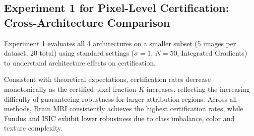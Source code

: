 \documentclass[11pt]{article}
\begin{document}
\subsection{Experiment 1 for Pixel-Level Certification: Cross-Architecture Comparison}

Experiment 1 evaluates all 4 architectures on a smaller subset (5 images per dataset, 20 total) using standard settings ($\sigma=1$, $N=50$, Integrated Gradients) to understand architecture effects on certification. 

\begin{table}[h!]
\centering
\caption{Experiment 1: Average certification accuracy (\%) across datasets and models for different top-$K$ certified pixel fractions.}
\label{tab:exp1_cert}
\end{table}
Consistent with theoretical expectations, certification rates decrease monotonically as the certified pixel fraction $K$ increases, reflecting the increasing difficulty of guaranteeing robustness for larger attribution regions. Across all methods, Brain MRI consistently achieves the highest certification rates, while Fundus and ISIC exhibit lower robustness due to class imbalance, color and texture complexity. 
\end{document}
